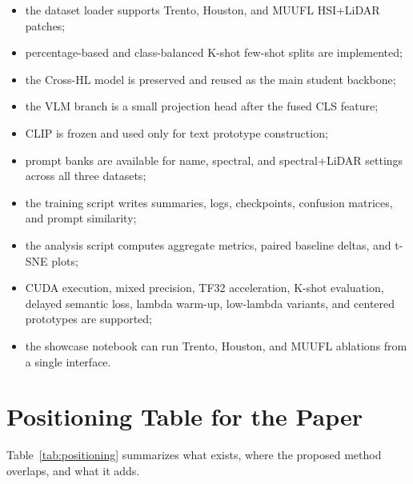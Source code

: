 \documentclass[10pt,journal,compsoc]{IEEEtran}
\begin{document}
\begin{itemize}
    \item the dataset loader supports Trento, Houston, and MUUFL HSI+LiDAR patches;
    \item percentage-based and class-balanced K-shot few-shot splits are implemented;
    \item the Cross-HL model is preserved and reused as the main student backbone;
    \item the VLM branch is a small projection head after the fused CLS feature;
    \item CLIP is frozen and used only for text prototype construction;
    \item prompt banks are available for name, spectral, and spectral+LiDAR settings across all three datasets;
    \item the training script writes summaries, logs, checkpoints, confusion matrices, and prompt similarity;
    \item the analysis script computes aggregate metrics, paired baseline deltas, and t-SNE plots;
    \item CUDA execution, mixed precision, TF32 acceleration, K-shot evaluation, delayed semantic loss, lambda warm-up, low-lambda variants, and centered prototypes are supported;
    \item the showcase notebook can run Trento, Houston, and MUUFL ablations from a single interface.
\end{itemize}

\section{Positioning Table for the Paper}

Table~\ref{tab:positioning} summarizes what exists, where the proposed method overlaps, and what it adds.
\end{document}
